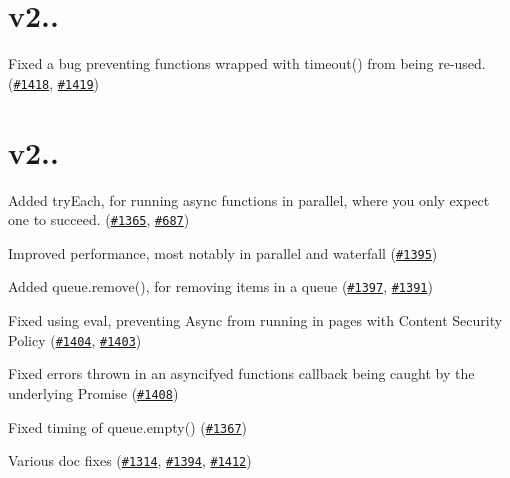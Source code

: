 \section*{v2..}


\begin{DoxyItemize}
\item Fixed a bug preventing functions wrapped with {\ttfamily timeout()} from being re-\/used. (\href{https://github.com/caolan/async/issues/1418}{\tt \#1418}, \href{https://github.com/caolan/async/issues/1419}{\tt \#1419})
\end{DoxyItemize}

\section*{v2..}


\begin{DoxyItemize}
\item Added {\ttfamily try\+Each}, for running async functions in parallel, where you only expect one to succeed. (\href{https://github.com/caolan/async/issues/1365}{\tt \#1365}, \href{https://github.com/caolan/async/issues/687}{\tt \#687})
\item Improved performance, most notably in {\ttfamily parallel} and {\ttfamily waterfall} (\href{https://github.com/caolan/async/issues/1395}{\tt \#1395})
\item Added {\ttfamily queue.\+remove()}, for removing items in a {\ttfamily queue} (\href{https://github.com/caolan/async/issues/1397}{\tt \#1397}, \href{https://github.com/caolan/async/issues/1391}{\tt \#1391})
\item Fixed using {\ttfamily eval}, preventing Async from running in pages with Content Security Policy (\href{https://github.com/caolan/async/issues/1404}{\tt \#1404}, \href{https://github.com/caolan/async/issues/1403}{\tt \#1403})
\item Fixed errors thrown in an {\ttfamily asyncify}ed function\textquotesingle{}s callback being caught by the underlying Promise (\href{https://github.com/caolan/async/issues/1408}{\tt \#1408})
\item Fixed timing of {\ttfamily queue.\+empty()} (\href{https://github.com/caolan/async/issues/1367}{\tt \#1367})
\item Various doc fixes (\href{https://github.com/caolan/async/issues/1314}{\tt \#1314}, \href{https://github.com/caolan/async/issues/1394}{\tt \#1394}, \href{https://github.com/caolan/async/issues/1412}{\tt \#1412})
\end{DoxyItemize}

